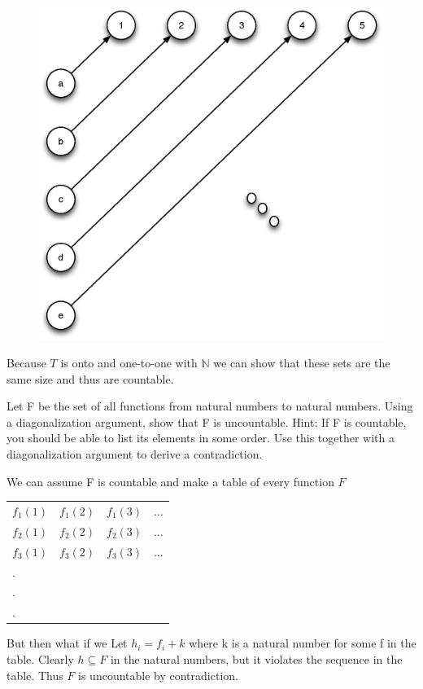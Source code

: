 \begin{problem}{1}
\begin{solution}
\begin{figure}[H]
      \includegraphics[scale=.5]{problem_1_b.eps}
      \label{fig:problem_1_b}
    \end{figure}
    Because $T$ is onto and one-to-one with $\mathbb{N}$ we can show that these sets are the same size and thus are
    countable.
  \end{solution}
\end{problem}

\begin{problem}{2}
  Let F be the set of all functions from natural numbers to natural numbers. Using a diagonalization argument, show that
  F is uncountable. Hint: If F is countable, you should be able to list its elements in some order. Use this together
  with a diagonalization argument to derive a contradiction.
  \begin{solution}
    We can assume F is countable and make a table of every function $F$
    \begin{tabular}{ l c r l }
      $f_1(1)$ & $f_1(2)$ & $f_1(3)$ & $\ldots$ \\
      $f_2(1)$ & $f_2(2)$ & $f_2(3)$ & $\ldots$ \\
      $f_3(1)$ & $f_3(2)$ & $f_3(3)$ & $\ldots$ \\
      .\\
      .\\
      .\\
    \end{tabular}
    But then what if we Let $h_i = f_i + k$ where k is a natural number for some f in the table. Clearly $h \subseteq F$
    in the natural numbers, but it violates the sequence in the table. Thus $F$ is uncountable by contradiction.
  \end{solution}
\end{problem}

